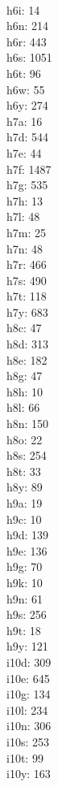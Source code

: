 \begin{multicols}{8}
  \\ h6i: 14
  \\ h6n: 214
  \\ h6r: 443
  \\ h6s: 1051
  \\ h6t: 96
  \\ h6w: 55
  \\ h6y: 274
  \\ h7a: 16
  \\ h7d: 544
  \\ h7e: 44
  \\ h7f: 1487
  \\ h7g: 535
  \\ h7h: 13
  \\ h7l: 48
  \\ h7m: 25
  \\ h7n: 48
  \\ h7r: 466
  \\ h7s: 490
  \\ h7t: 118
  \\ h7y: 683
  \\ h8c: 47
  \\ h8d: 313
  \\ h8e: 182
  \\ h8g: 47
  \\ h8h: 10
  \\ h8l: 66
  \\ h8n: 150
  \\ h8o: 22
  \\ h8s: 254
  \\ h8t: 33
  \\ h8y: 89
  \\ h9a: 19
  \\ h9c: 10
  \\ h9d: 139
  \\ h9e: 136
  \\ h9g: 70
  \\ h9k: 10
  \\ h9n: 61
  \\ h9s: 256
  \\ h9t: 18
  \\ h9y: 121
  \\ i10d: 309
  \\ i10e: 645
  \\ i10g: 134
  \\ i10l: 234
  \\ i10n: 306
  \\ i10s: 253
  \\ i10t: 99
  \\ i10y: 163

\end{multicols}
